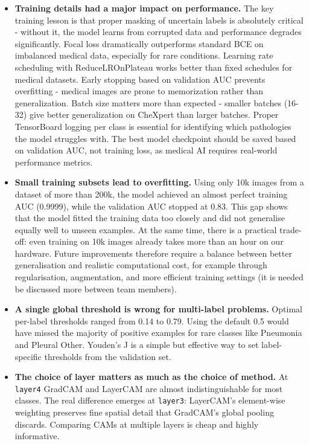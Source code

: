 \documentclass[12pt]{article}
\begin{document}
\begin{itemize}
    \item \textbf{Training details had a major impact on performance.}
    The key training lesson is that proper masking of uncertain labels is absolutely critical - without it, the model learns from corrupted data and performance degrades significantly. Focal loss dramatically outperforms standard BCE on imbalanced medical data, especially for rare conditions. Learning rate scheduling with ReduceLROnPlateau works better than fixed schedules for medical datasets. Early stopping based on validation AUC prevents overfitting - medical images are prone to memorization rather than generalization. Batch size matters more than expected - smaller batches (16-32) give better generalization on CheXpert than larger batches. Proper TensorBoard logging per class is essential for identifying which pathologies the model struggles with. The best model checkpoint should be saved based on validation AUC, not training loss, as medical AI requires real-world performance metrics.


    \item \textbf{Small training subsets lead to overfitting.}
    Using only 10k images from a dataset of more than 200k, the model achieved an almost perfect training AUC (0.9999), while the validation AUC stopped at 0.83. This gap shows that the model fitted the training data too closely and did not generalise equally well to unseen examples. At the same time, there is a practical trade-off: even training on 10k images already takes more than an hour on our hardware. Future improvements therefore require a balance between better generalisation and realistic computational cost, for example through regularisation, augmentation, and more efficient training settings (it is needed be discussed more between team members).

    \item \textbf{A single global threshold is wrong for multi-label problems.}
    Optimal per-label thresholds ranged from 0.14 to 0.79.
    Using the default 0.5 would have missed the majority of positive examples for rare classes like Pneumonia and Pleural Other.
    Youden's J is a simple but effective way to set label-specific thresholds from the validation set.

    \item \textbf{The choice of layer matters as much as the choice of method.}
    At \texttt{layer4} GradCAM and LayerCAM are almost indistinguishable for most classes.
    The real difference emerges at \texttt{layer3}: LayerCAM's element-wise weighting preserves fine spatial detail that GradCAM's global pooling discards.
    Comparing CAMs at multiple layers is cheap and highly informative.


\end{itemize}
\end{document}
